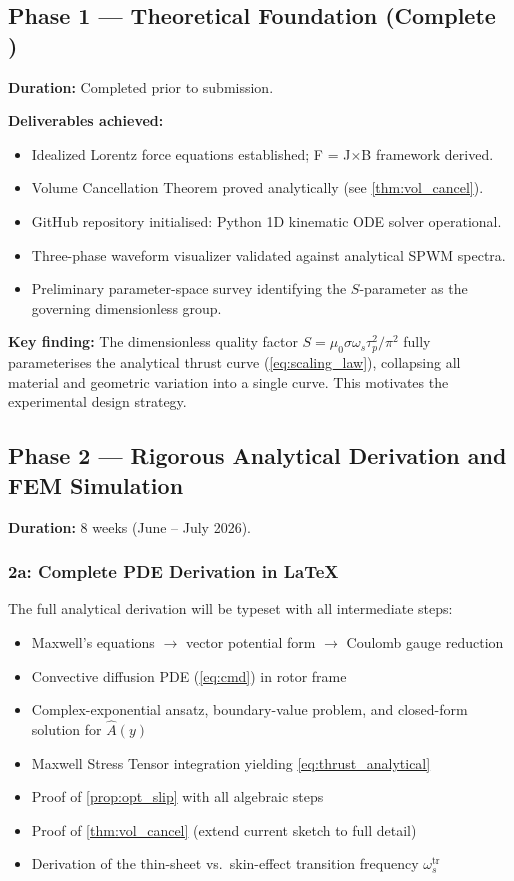 \documentclass[12pt,letterpaper]{article}
\begin{document}
\subsection{Phase 1 — Theoretical Foundation (Complete \checkmark)}

\textbf{Duration:} Completed prior to submission.

\textbf{Deliverables achieved:}
\begin{itemize}[noitemsep]
  \item Idealized Lorentz force equations established; F = J$\times$B framework derived.
  \item Volume Cancellation Theorem proved analytically (see \cref{thm:vol_cancel}).
  \item GitHub repository initialised: Python 1D kinematic ODE solver operational.
  \item Three-phase waveform visualizer validated against analytical SPWM spectra.
  \item Preliminary parameter-space survey identifying the $S$-parameter as the
    governing dimensionless group.
\end{itemize}

\textbf{Key finding:} The dimensionless quality factor $S = \mu_0\sigma\omega_s\tau_p^2/\pi^2$
fully parameterises the analytical thrust curve (\cref{eq:scaling_law}), collapsing all
material and geometric variation into a single curve. This motivates the experimental
design strategy.

\subsection{Phase 2 — Rigorous Analytical Derivation and FEM Simulation}
\label{sec:phase2}

\textbf{Duration:} 8 weeks (June -- July 2026).

\subsubsection{2a: Complete PDE Derivation in \LaTeX}

The full analytical derivation will be typeset with all intermediate steps:
\begin{itemize}[noitemsep]
  \item Maxwell's equations $\to$ vector potential form $\to$ Coulomb gauge reduction
  \item Convective diffusion PDE (\cref{eq:cmd}) in rotor frame
  \item Complex-exponential ansatz, boundary-value problem, and closed-form solution
    for $\hat{A}(y)$
  \item Maxwell Stress Tensor integration yielding \cref{eq:thrust_analytical}
  \item Proof of \cref{prop:opt_slip} with all algebraic steps
  \item Proof of \cref{thm:vol_cancel} (extend current sketch to full detail)
  \item Derivation of the thin-sheet vs.\ skin-effect transition frequency
    $\omega_s^{\mathrm{tr}}$
\end{itemize}
\end{document}
